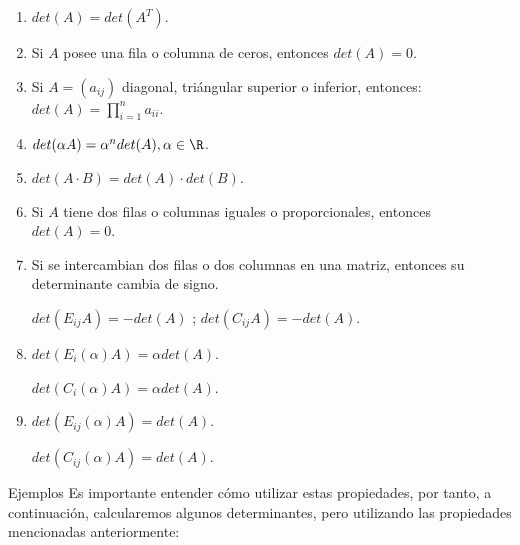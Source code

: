 \begin{enumerate}
\item
$det(A) = det(A^T)$.

\item
Si  $A$ posee una fila o columna de ceros, entonces $det(A) =0.$

\item
Si $A=(a_{ij})$ diagonal, triángular superior o inferior, entonces: 
$det(A) = \prod _{i=1}^n a_{ii}$.

\item
$det(\alpha A) = \alpha^n det(A), \alpha \in \R$.

\item
$det(A\cdot B) = det(A) \cdot det(B)$.

\item
Si $A$ tiene dos filas o columnas iguales o proporcionales, entonces $det(A)=0$.

\item
Si se intercambian dos filas o dos columnas en una matriz, entonces su determinante cambia de signo.

$det(E_{ij}A)  = - det(A)$ ; $ det(C_{ij}A) = -  det(A)$.

\item
$det(E_{i}(\alpha )A) = \alpha det(A)$.

$det(C_{i}(\alpha )A) = \alpha det(A)$.

\item
$det(E_{ij}(\alpha )A) =det(A)$.

$det(C_{ij}(\alpha )A) = det(A)$.

\end{enumerate}


{Ejemplos}
Es importante entender cómo utilizar estas propiedades, por tanto, a continuación,  calcularemos algunos determinantes, pero utilizando las propiedades mencionadas anteriormente:

